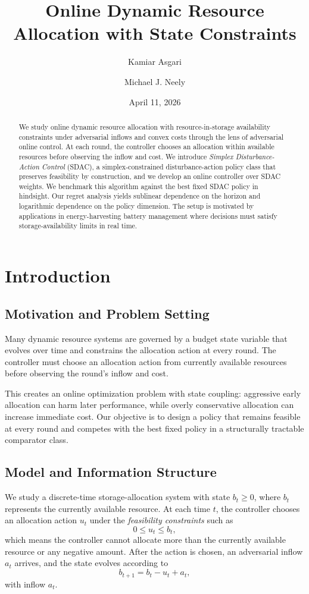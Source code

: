 \documentclass[11pt]{article}
\title{Online Dynamic Resource Allocation with State Constraints}
\author{Kamiar Asgari \and Michael J. Neely}
\date{April 11, 2026}
\begin{document}
\maketitle

\begin{abstract}
We study online dynamic resource allocation with resource-in-storage availability constraints under adversarial inflows and convex costs through the lens of adversarial online control. At each round, the controller chooses an allocation within available resources before observing the inflow and cost. We introduce \emph{Simplex Disturbance-Action Control} (SDAC), a simplex-constrained disturbance-action policy class that preserves feasibility by construction, and we develop an online controller over SDAC weights. We benchmark this algorithm against the best fixed SDAC policy in hindsight. Our regret analysis yields sublinear dependence on the horizon and logarithmic dependence on the policy dimension. The setup is motivated by applications in energy-harvesting battery management where decisions must satisfy storage-availability limits in real time.
\end{abstract}

\section{Introduction}
\label{sec:introduction}

\subsection{Motivation and Problem Setting}
Many dynamic resource systems are governed by a budget state variable that evolves over time and constrains the allocation action at every round. The controller must choose an allocation action from currently available resources before observing the round's inflow and cost.

This creates an online optimization problem with state coupling: aggressive early allocation can harm later performance, while overly conservative allocation can increase immediate cost. Our objective is to design a policy that remains feasible at every round and competes with the best fixed policy in a structurally tractable comparator class.

\subsection{Model and Information Structure}
We study a discrete-time storage-allocation system with state $b_t \geq 0$, where $b_t$ represents the currently available resource. At each time $t$, the controller chooses an allocation action $u_t$ under the \emph{feasibility constraints} such as
\[
0 \leq u_t \leq b_t,
\]
which means the controller cannot allocate more than the currently available resource or any negative amount. After the action is chosen, an adversarial inflow $a_t$ arrives, and the state evolves according to
\[
b_{t+1} = b_t - u_t + a_t,
\]
with inflow $a_t$.
\end{document}
